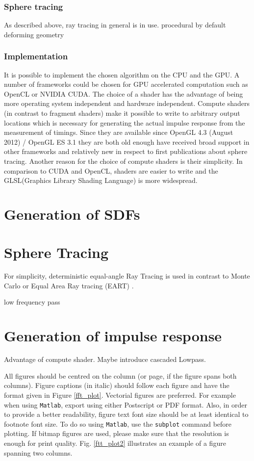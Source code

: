 \documentclass[twoside,a4paper]{article}
\begin{document}
\subsubsection{Sphere tracing}
As described above, ray tracing in general is in use.
procedural by default
deforming geometry
\subsubsection{Implementation}
It is possible to implement the chosen algorithm on the CPU and the GPU. A number of frameworks could be chosen for GPU accelerated computation such as OpenCL or NVIDIA CUDA. The choice of a shader has the advantage of being more operating system independent and hardware independent. Compute shaders (in contrast to fragment shaders) make it possible to write to arbitrary output locations which is necessary for generating the actual impulse response from the measurement of timings. Since they are available since OpenGL 4.3 (August 2012) / OpenGL ES 3.1 they are both old enough have received broad support in other frameworks and relatively new in respect to first publications about sphere tracing. Another reason for the choice of compute shaders is their simplicity. In comparison to CUDA and OpenCL, shaders are easier to write and the GLSL(Graphics Library Shading Language) is more widespread. 


\section{Generation of SDFs}

\section{Sphere Tracing}
For simplicity, deterministic equal-angle Ray Tracing is used in contrast to Monte Carlo or Equal Area Ray tracing (EART) \cite{gu_room_2014}.

low frequency pass

\section{Generation of impulse response}

Advantage of compute shader.
Maybe introduce cascaded Lowpass.



All figures should be centred on the column (or page, if the figure spans both columns).
Figure captions (in italic) should follow each figure and have the format given in Figure \ref{fft_plot}.
%
Vectorial figures are preferred. For example when using
\texttt{Matlab}, export using either Postscript or PDF format. Also,
in order to provide a better readability, figure text font size
should be at least identical to footnote font size. To do so using
\texttt{Matlab}, use the \texttt{subplot} command before plotting.
If bitmap figures are used, please make sure that the resolution is
enough for print quality. Fig. \ref{ftt_plot2} illustrates an
example of a figure spanning two columns.
%
\end{document}
